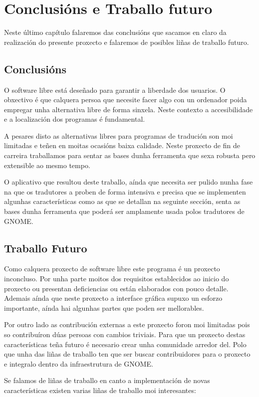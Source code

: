 \chapter{Conclusións e Traballo futuro}

Neste último capítulo falaremos das conclusións que sacamos en claro da realización do presente proxecto e falaremos de posibles liñas de traballo futuro.

\section{Conclusións}
O software libre está deseñado para garantir a liberdade dos usuarios. O obxectivo é que calquera persoa que necesite facer algo con un ordenador poida empregar unha alternativa libre de forma sinxela. Neste contexto a accesibilidade e a localización dos programas é fundamental.

A pesares disto as alternativas libres para programas de tradución son moi limitadas e teñen en moitas ocasións baixa calidade. Neste proxecto de fin de carreira traballamos para sentar as bases dunha ferramenta que sexa robusta pero extensible ao mesmo tempo.

O aplicativo que resultou deste traballo, aínda que necesita ser pulido nunha fase na que os tradutores a proben de forma intensiva e precisa que se implementen algunhas características como as que se detallan na seguinte sección, senta as bases dunha ferramenta que poderá ser amplamente usada polos tradutores de GNOME.

\section{Traballo Futuro}
Como calquera proxecto de software libre este programa é un proxecto inconcluso. Por unha parte moitos dos requisitos establecidos ao inicio do proxecto ou presentan deficiencias ou están elaborados con pouco detalle. Ademais aínda que neste proxecto a interface gráfica supuxo un esforzo importante, aínda hai algunhas partes que poden ser mellorables.

Por outro lado as contribución externas a este proxecto foron moi limitadas pois so contribuíron dúas persoas con cambios triviais. Para que un proxecto destas características teña futuro é necesario crear unha comunidade arredor del. Polo que unha das liñas de traballo ten que ser buscar contribuidores para o proxecto e integralo dentro da infraestrutura de GNOME.

Se falamos de liñas de traballo en canto a implementación de novas características existen varias liñas de traballo moi interesantes:

